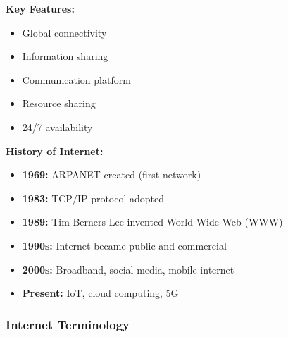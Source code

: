 \documentclass[12pt,a4paper]{article}
\begin{document}
\textbf{Key Features:}
\begin{itemize}
    \item Global connectivity
    \item Information sharing
    \item Communication platform
    \item Resource sharing
    \item 24/7 availability
\end{itemize}

\textbf{History of Internet:}
\begin{itemize}
    \item \textbf{1969:} ARPANET created (first network)
    \item \textbf{1983:} TCP/IP protocol adopted
    \item \textbf{1989:} Tim Berners-Lee invented World Wide Web (WWW)
    \item \textbf{1990s:} Internet became public and commercial
    \item \textbf{2000s:} Broadband, social media, mobile internet
    \item \textbf{Present:} IoT, cloud computing, 5G
\end{itemize}

\subsubsection{Internet Terminology}
\end{document}
